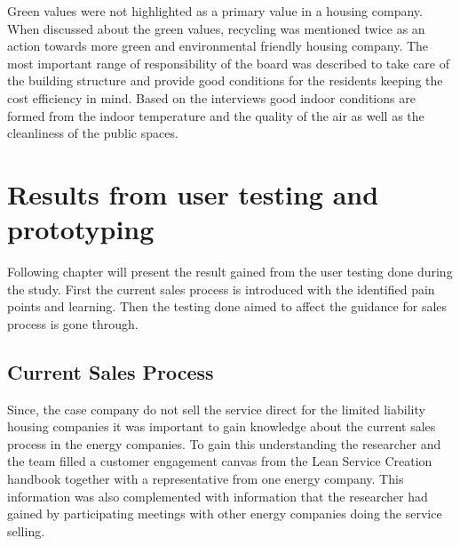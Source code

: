 Green values were not highlighted as a primary value in a housing company. When discussed about the green values, recycling was mentioned twice as an action towards more green and environmental friendly housing company. The most important range of responsibility of the board was described to take care of the building structure and provide good conditions for the residents keeping the cost efficiency in mind. Based on the interviews good indoor conditions are formed from the indoor temperature and the quality of the air as well as the cleanliness of the public spaces.


\section{Results from user testing and prototyping}

Following chapter will present the result gained from the user testing done during the study. First the current sales process is introduced with the identified pain points and learning. Then the testing done aimed to affect the guidance for sales process is gone through.

\subsection{Current Sales Process}

Since, the case company do not sell the service direct for the limited liability housing companies it was important to gain knowledge about the current sales process in the energy companies. To gain this understanding the researcher and the team filled a customer engagement canvas from the Lean Service Creation handbook together with a representative from one energy company. This information was also complemented with information that the researcher had gained by participating meetings with other energy companies doing the service selling.

